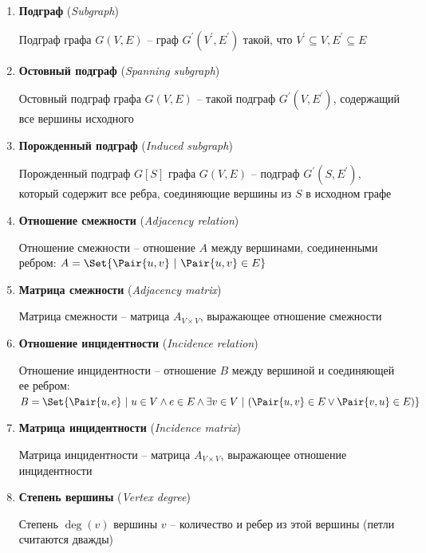 \documentclass[12pt]{article}
\begin{document}
\begin{enumerate}
        \item \textbf{Подграф} (\textit{Subgraph})

        Подграф графа $G(V, E)$ -- граф $G^\prime(V^\prime, E^\prime)$
        такой, что $V^\prime \subseteq V, E^\prime \subseteq E$

        \item \textbf{Остовный подграф} (\textit{Spanning subgraph})

        Остовный подграф графа $G(V, E)$ -- такой подграф $G^\prime(V, E^\prime)$, содержащий все вершины исходного


        \item \textbf{Порожденный подграф} (\textit{Induced subgraph})

        Порожденный подграф $G[S]$ графа $G(V, E)$ -- подграф $G^\prime(S, E^\prime)$, который содержит все ребра, соединяющие вершины из $S$ в исходном графе

        \item \textbf{Отношение смежности} (\textit{Adjacency relation})

        Отношение смежности -- отношение $A$ между вершинами, соединенными ребром: $A = \Set{\Pair{u, v} \ | \ \Pair{u, v} \in E}$

        \item \textbf{Матрица смежности} (\textit{Adjacency matrix})

        Матрица смежности -- матрица $A_{V\times V}$, выражающее отношение смежности


        \item \textbf{Отношение инцидентности} (\textit{Incidence relation})

        Отношение инцидентности -- отношение $B$ между вершиной и соединяющей ее ребром: $B = \Set{\Pair{u, e} \ | \ u \in V \land e \in E \land \exists v \in V \ | \ (\Pair{u, v} \in E \lor \Pair{v, u} \in E)}$

        \item \textbf{Матрица инцидентности} (\textit{Incidence matrix})

        Матрица инцидентности -- матрица $A_{V\times V}$, выражающее отношение инцидентности


        \item \textbf{Степень вершины} (\textit{Vertex degree})

        Степень $\deg(v)$ вершины $v$ -- количество и ребер из этой вершины (петли считаются дважды)


\end{enumerate}
\end{document}
